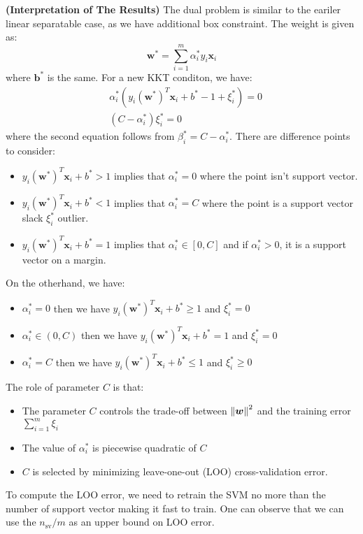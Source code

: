 \begin{remark}{\textbf{(Interpretation of The Results)}}
    The dual problem is similar to the eariler linear separatable case, as we have additional box constraint. The weight is given as:
    \begin{equation*}
        \boldsymbol w^* = \sum^m_{i=1}\alpha_i^*y_i\boldsymbol x_i
    \end{equation*}
    where $\boldsymbol b^*$ is the same. For a new KKT conditon, we have:
    \begin{equation*}
    \begin{aligned}
        &\alpha_i^*(y_i(\boldsymbol w^*)^T\boldsymbol x_i + b^* - 1 + \xi^*_i) = 0 \\
        &(C-\alpha^*_i)\xi^*_i = 0
    \end{aligned}
    \end{equation*}
    where the second equation follows from $\beta_i^* = C - \alpha^*_i$. There are difference points to consider:
    \begin{itemize}
        \item $y_i(\boldsymbol w^*)^T\boldsymbol x_i + b^* > 1$ implies that $\alpha_i^* = 0$ where the point isn't support vector. 
        \item $y_i(\boldsymbol w^*)^T\boldsymbol x_i + b^* < 1$ implies that $\alpha_i^* = C$ where the point is a support vector slack $\xi^*_i$ outlier. 
        \item $y_i(\boldsymbol w^*)^T\boldsymbol x_i + b^* = 1$ implies that $\alpha_i^* \in [0, C]$ and if $\alpha_i^*>0$, it is a support vector on a margin. 
    \end{itemize}
    On the otherhand, we have:
    \begin{itemize}
        \item $\alpha_i^* = 0$ then we have $y_i(\boldsymbol w^*)^T\boldsymbol x_i + b^* \ge 1$ and $\xi_i^*=0$
        \item $\alpha_i^* \in (0, C)$ then we have $y_i(\boldsymbol w^*)^T\boldsymbol x_i + b^* = 1$ and $\xi_i^*=0$
        \item $\alpha_i^* = C$ then we have $y_i(\boldsymbol w^*)^T\boldsymbol x_i + b^* \le 1$ and $\xi_i^*\ge0$
    \end{itemize}
\end{remark}

\begin{remark}
    The role of parameter $C$ is that:
    \begin{itemize}
        \item The parameter $C$ controls the trade-off between $\left\lVert\boldsymbol w\right\rVert^2$ and the training error $\sum^m_{i=1}\xi_i$
        \item The value of $\alpha_i^*$ is piecewise quadratic of $C$
        \item $C$ is selected by minimizing leave-one-out (LOO) cross-validation error.
    \end{itemize}
    To compute the LOO error, we need to retrain the SVM no more than the number of support vector making it fast to train. One can observe that we can use the $n_\text{sv}/m$ as an upper bound on LOO error.
\end{remark}


